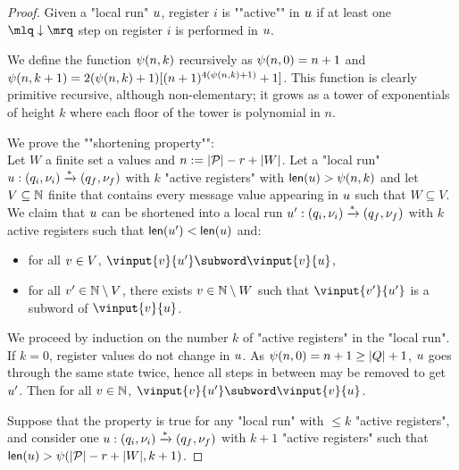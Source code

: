 \begin{proof}
	Given a "local run" $u$, register $i$ is ""active"" in $u$ if at least one $\quotemarks{\enregact}$ step on register $i$ is performed in $u$. 
	
	We define the function $\psi(n,k)$ recursively as $\psi(n,0) = n+1$ and $\psi(n,k+1) = 2(\psi(n,k) +1) [(n+1)^{4(\psi(n,k)+1)} +1]$. This function is clearly primitive recursive, although non-elementary; it grows as a tower of exponentials of height $k$ where each floor of the tower is polynomial in $n$.
	
	We prove the ""shortening property"": \\
	Let $W$ a finite set a values and $n:=|\mathcal{P}| -r + |W|$.
	Let a "local run" $u: (q_i, \nu_i) \xrightarrow{*} (q_f, \nu_f)$ with $k$ "active registers" with $\mathsf{len}(u) > \psi(n,k)$ and let $V \subseteq \mathbb{N}$ finite that contains every message value appearing in $u$ such that $W \subseteq V$. We claim that $u$ can be shortened into a local run $u': (q_i, \nu_i) \xrightarrow{*} (q_f, \nu_f)$ with $k$ active registers such that $\mathsf{len}(u') < \mathsf{len}(u)$ and:
	\begin{itemize}
		\item for all $v \in V$, $\vinput{\aval}{\localrun'} \subword \vinput{\aval}{\localrun}$,
		\item for all $v' \in \mathbb{N} \setminus V$, there exists $v \in \mathbb{N} \setminus W$ such that $\vinput{\aval'}{\localrun'}$ is a subword of $\vinput{\aval}{\localrun}$.
	\end{itemize}
	
	We proceed by induction on the number $k$ of "active registers" in the "local run". If $k=0$, register values do not change in $u$. As $\psi(n,0) = n+1 \geq |Q|+1$, $u$ goes through the same state twice, hence all steps in between may be removed to get $u'$. Then for all $v \in \mathbb{N}$,  $\vinput{\aval}{\localrun'} \subword \vinput{\aval}{\localrun}$.
	
	Suppose that the property is true for any "local run" with $\leq k$ "active registers", and consider one $u: (q_i,\nu_i) \xrightarrow{*} (q_f,\nu_f)$ with $k+1$ "active registers" such that $\mathsf{len}(u) > \psi(|\mathcal{P}| -r + |W|,k+1)$. 
	

\end{proof}
